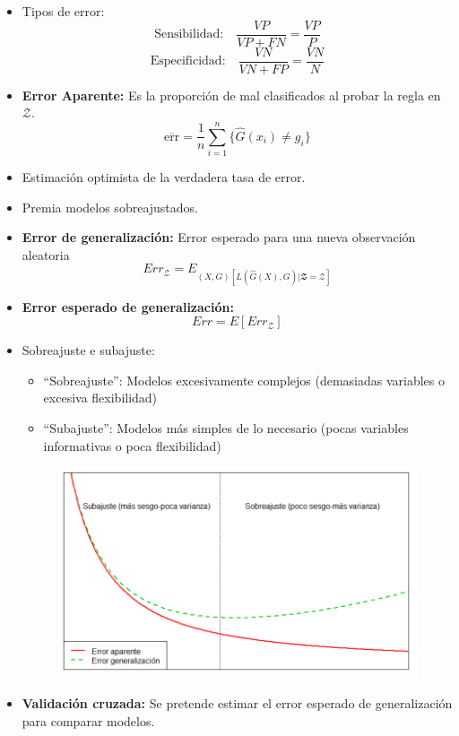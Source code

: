\begin{itemize}
    \item Tipos de error:
    \[
        \text{Sensibilidad:} \quad \frac{VP}{VP+FN}=\frac{VP}{P}
    \]
    \[
        \text{Especificidad:} \quad \frac{VN}{VN+FP}=\frac{VN}{N}
    \]
    \item \textbf{Error Aparente:} Es la proporción de mal clasificados al probar la regla en $\mathcal{Z}$.
    \[
        \overline{\text{err}}=\frac{1}{n}\sum_{i=1}^n\{\hat{G}(x_i)\neq g_i\}
    \]
    \item Estimación optimista de la verdadera tasa de error.
    \item Premia modelos sobreajustados.
    \item \textbf{Error de generalización:} Error esperado para una nueva observación aleatoria
    \[
        Err_{\mathcal{Z}}=E_{(X,G)[L(\hat{G}(X),G)|\mathbfcal{Z}=\mathcal{Z}]}
    \]
    \item \textbf{Error esperado de generalización:}
    \[
        Err=E[Err_{\mathcal{Z}}]
    \]
    \newpage
    \item Sobreajuste e subajuste:
    \begin{itemize}
        \item ``Sobreajuste'': Modelos excesivamente complejos (demasiadas variables o excesiva flexibilidad)
        \item ``Subajuste'': Modelos más simples de lo necesario (pocas variables informativas o poca flexibilidad)
    \end{itemize}
    \begin{figure}[ht]
        \centering
        \includegraphics[width=\textwidth]{assets/overfitting_underfitting.png}
    \end{figure}
    \item \textbf{Validación cruzada:} Se pretende estimar el error esperado de generalización para comparar modelos.

\end{itemize}
